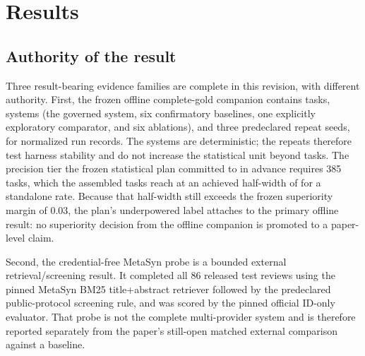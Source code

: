 \section{Results}
\label{sec:results}

\subsection{Authority of the result}
Three result-bearing evidence families are complete in this revision, with
different authority.  First, the frozen offline complete-gold companion contains
\OfflineTaskCount{} tasks, \OfflineSystemCount{} systems (the governed system, six confirmatory baselines, one explicitly
exploratory comparator, and six ablations), and three predeclared repeat seeds,
for \OfflineRunRecordCount{} normalized run records.  The systems are deterministic; the repeats
therefore test harness stability and do not increase the statistical unit beyond
\OfflineTaskCount{} tasks.  The precision tier the frozen statistical plan committed to in advance
requires 385 tasks, which the assembled \OfflineTaskCount{} tasks reach at an
achieved half-width of \OfflineAchievedHalfWidth{} for a standalone rate.
Because that half-width still exceeds the frozen superiority margin of 0.03,
the plan's underpowered label attaches to the primary offline result: no
superiority decision from the offline companion is promoted to a paper-level
claim.

Second, the credential-free MetaSyn probe is a bounded external
retrieval/screening result.  It completed all 86 released test reviews using the
pinned MetaSyn BM25 title+abstract retriever followed by the predeclared
public-protocol screening rule, and was scored by the pinned official ID-only
evaluator.  That probe is not the complete multi-provider system and is
therefore reported separately from the paper's still-open matched external
comparison against a baseline.

